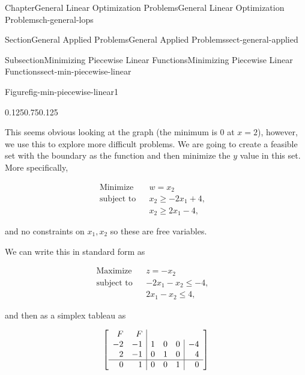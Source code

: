 \documentclass[oneside,10pt,]{book}
\numberwithin{equation}{section}
\newcommand{\amp}{&}
\begin{document}
\begin{chapterptx}{Chapter}{General Linear Optimization Problems}{}{General Linear Optimization Problems}{}{}{ch-general-lops}
\begin{sectionptx}{Section}{General Applied Problems}{}{General Applied Problems}{}{}{sect-general-applied}
\begin{subsectionptx}{Subsection}{Minimizing Piecewise Linear Functions}{}{Minimizing Piecewise Linear Functions}{}{}{sect-min-piecewise-linear}
\begin{figureptx}{Figure}{}{fig-min-piecewise-linear1}{}
\begin{image}{0.125}{0.75}{0.125}{}%
%
\end{image}%
\tcblower
\end{figureptx}%
This seems obvious looking at the graph (the minimum is 0 at \(x=2\)), however, we use this to explore more difficult problems. We are going to create a feasible set with the boundary as the function and then minimize the \(y\) value in this set. More specifically,%
\par
%
\begin{equation*}
\begin{aligned} \text{Minimize} \amp \amp w = x_2 \amp \\ \text{subject to} \amp \amp x_2 \geq -2x_1 + 4, \\ \amp \amp x_2 \geq 2x_1 - 4, \end{aligned}
\end{equation*}
%
\par
and no constraints on \(x_1, x_2\) so these are free variables.%
\par
We can write this in standard form as%
\par
%
\begin{equation*}
\begin{aligned} \text{Maximize} \amp \amp z = - x_2 \amp \\ \text{subject to} \amp \amp -2x_1 - x_2 \leq -4, \\ \amp \amp 2x_1 - x_2 \leq 4, \end{aligned}
\end{equation*}
%
\par
and then as a simplex tableau as%
\par
%
\begin{equation*}
\left[\begin{array}{rr|rrr|r} {\small F} \amp {\small F} \\ -2 \amp -1 \amp 1 \amp 0 \amp 0 \amp -4\\ 2 \amp -1 \amp 0 \amp 1 \amp 0 \amp 4\\ \hline 0 \amp 1 \amp 0 \amp 0 \amp 1 \amp 0\\ \end{array} \right]

\end{equation*}
\end{subsectionptx}
\end{sectionptx}
\end{chapterptx}
\end{document}
